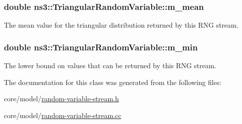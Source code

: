 \subsubsection[{\texorpdfstring{m\+\_\+mean}{m_mean}}]{\setlength{\rightskip}{0pt plus 5cm}double ns3\+::\+Triangular\+Random\+Variable\+::m\+\_\+mean\hspace{0.3cm}{\ttfamily [private]}}\hypertarget{classns3_1_1TriangularRandomVariable_a9c1b9e0f4bf53d8277fdb76275df731a}{}\label{classns3_1_1TriangularRandomVariable_a9c1b9e0f4bf53d8277fdb76275df731a}
The mean value for the triangular distribution returned by this R\+NG stream. 
\subsubsection[{\texorpdfstring{m\+\_\+min}{m_min}}]{\setlength{\rightskip}{0pt plus 5cm}double ns3\+::\+Triangular\+Random\+Variable\+::m\+\_\+min\hspace{0.3cm}{\ttfamily [private]}}\hypertarget{classns3_1_1TriangularRandomVariable_acd78d6af1b19000d64c22fd2aba49493}{}\label{classns3_1_1TriangularRandomVariable_acd78d6af1b19000d64c22fd2aba49493}
The lower bound on values that can be returned by this R\+NG stream. 

The documentation for this class was generated from the following files\+:\begin{DoxyCompactItemize}
\item 
core/model/\hyperlink{random-variable-stream_8h}{random-\/variable-\/stream.\+h}\item 
core/model/\hyperlink{random-variable-stream_8cc}{random-\/variable-\/stream.\+cc}\end{DoxyCompactItemize}
